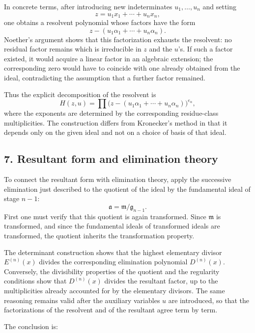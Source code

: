 \documentclass[11pt]{article}
\begin{document}
In concrete terms, after introducing new indeterminates $u_1,\ldots,u_n$ and setting
\[
  z=u_1x_1+\cdots+u_nx_n,
\]
one obtains a resolvent polynomial whose factors have the form
\[
  z-(u_1\alpha_1+
\cdots+u_n\alpha_n).
\]
Noether's argument shows that this factorization exhausts the resolvent: no residual factor remains which is irreducible in $z$ and the $u$'s. If such a factor existed, it would acquire a linear factor in an algebraic extension; the corresponding zero would have to coincide with one already obtained from the ideal, contradicting the assumption that a further factor remained.

Thus the explicit decomposition of the resolvent is
\begin{equation}
  H(z,u)=\prod\bigl(z-(u_1\alpha_1+
\cdots+u_n\alpha_n)\bigr)^{e_\alpha},        \tag{36}
\end{equation}
where the exponents are determined by the corresponding residue-class multiplicities. The construction differs from Kronecker's method in that it depends only on the given ideal and not on a choice of basis of that ideal.

\subsection{7. Resultant form and elimination theory}

To connect the resultant form with elimination theory, apply the successive elimination just described to the quotient of the ideal by the fundamental ideal of stage $n-1$:
\[
  \mathfrak a=\mathfrak m/\mathfrak g_{n-1}.
\]
First one must verify that this quotient is again transformed. Since $\mathfrak m$ is transformed, and since the fundamental ideals of transformed ideals are transformed, the quotient inherits the transformation property.

The determinant construction shows that the highest elementary divisor $E^{(n)}(x)$ divides the corresponding elimination polynomial $D^{(n)}(x)$. Conversely, the divisibility properties of the quotient and the regularity conditions show that $D^{(n)}(x)$ divides the resultant factor, up to the multiplicities already accounted for by the elementary divisors. The same reasoning remains valid after the auxiliary variables $u$ are introduced, so that the factorizations of the resolvent and of the resultant agree term by term.

The conclusion is:
\end{document}
